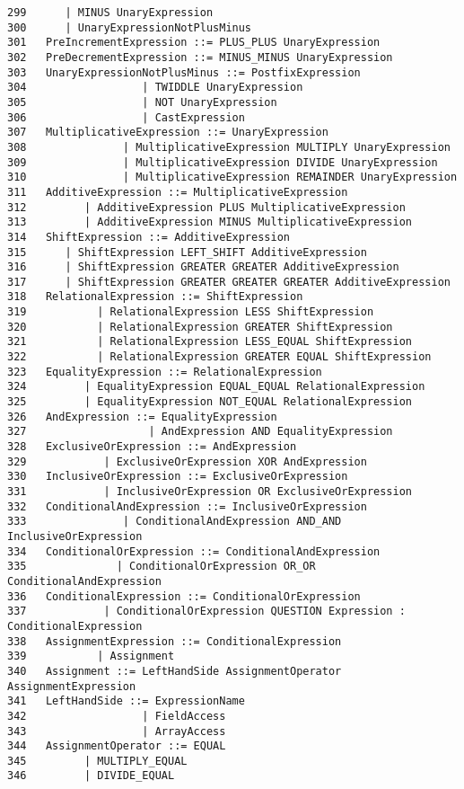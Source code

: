{\begin{verbatim}
299      | MINUS UnaryExpression
300      | UnaryExpressionNotPlusMinus
301   PreIncrementExpression ::= PLUS_PLUS UnaryExpression
302   PreDecrementExpression ::= MINUS_MINUS UnaryExpression
303   UnaryExpressionNotPlusMinus ::= PostfixExpression
304                  | TWIDDLE UnaryExpression
305                  | NOT UnaryExpression
306                  | CastExpression
307   MultiplicativeExpression ::= UnaryExpression
308               | MultiplicativeExpression MULTIPLY UnaryExpression
309               | MultiplicativeExpression DIVIDE UnaryExpression
310               | MultiplicativeExpression REMAINDER UnaryExpression
311   AdditiveExpression ::= MultiplicativeExpression
312         | AdditiveExpression PLUS MultiplicativeExpression
313         | AdditiveExpression MINUS MultiplicativeExpression
314   ShiftExpression ::= AdditiveExpression
315      | ShiftExpression LEFT_SHIFT AdditiveExpression
316      | ShiftExpression GREATER GREATER AdditiveExpression
317      | ShiftExpression GREATER GREATER GREATER AdditiveExpression
318   RelationalExpression ::= ShiftExpression
319           | RelationalExpression LESS ShiftExpression
320           | RelationalExpression GREATER ShiftExpression
321           | RelationalExpression LESS_EQUAL ShiftExpression
322           | RelationalExpression GREATER EQUAL ShiftExpression
323   EqualityExpression ::= RelationalExpression
324         | EqualityExpression EQUAL_EQUAL RelationalExpression
325         | EqualityExpression NOT_EQUAL RelationalExpression
326   AndExpression ::= EqualityExpression
327                   | AndExpression AND EqualityExpression
328   ExclusiveOrExpression ::= AndExpression
329            | ExclusiveOrExpression XOR AndExpression
330   InclusiveOrExpression ::= ExclusiveOrExpression
331            | InclusiveOrExpression OR ExclusiveOrExpression
332   ConditionalAndExpression ::= InclusiveOrExpression
333               | ConditionalAndExpression AND_AND InclusiveOrExpression
334   ConditionalOrExpression ::= ConditionalAndExpression
335              | ConditionalOrExpression OR_OR ConditionalAndExpression
336   ConditionalExpression ::= ConditionalOrExpression
337            | ConditionalOrExpression QUESTION Expression : ConditionalExpression
338   AssignmentExpression ::= ConditionalExpression
339           | Assignment
340   Assignment ::= LeftHandSide AssignmentOperator AssignmentExpression
341   LeftHandSide ::= ExpressionName
342                  | FieldAccess
343                  | ArrayAccess
344   AssignmentOperator ::= EQUAL
345         | MULTIPLY_EQUAL
346         | DIVIDE_EQUAL

\end{verbatim}}
